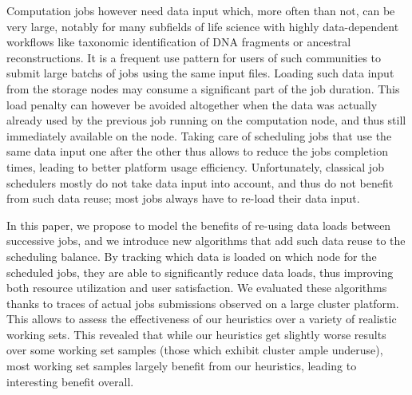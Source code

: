 \documentclass[conference]{IEEEtran}
\begin{document}
Computation jobs however need data input which, more often than not, can
be very large, notably for many subfields of life science with highly
data-dependent workflows like taxonomic identification of DNA fragments or ancestral reconstructions. It is a frequent use pattern for users of such communities to submit
large batchs of jobs using the same input files.
Loading such data input from the storage
nodes may consume a significant part of the job duration. This load
penalty can however be avoided altogether when the data was actually
already used by the previous job running on the computation node, and
thus still immediately available on the node. Taking care of scheduling
jobs that use the same data input one after the other thus allows to
reduce the jobs completion times, leading to better platform usage
efficiency. Unfortunately, classical job schedulers mostly do not take
data input into account, and thus do not benefit from such data reuse;
most jobs always have to re-load their data input.

In this paper, we propose to model the benefits of re-using data loads
between successive jobs, and we introduce new algorithms that add such
data reuse to the scheduling balance. By tracking which data is loaded
on which node for the scheduled jobs, they are able to significantly
reduce data loads, thus improving both resource utilization and user
satisfaction. We evaluated these algorithms thanks to traces of actual
jobs submissions observed on a large cluster platform. This allows to
assess the effectiveness of our heuristics over a variety of realistic
working sets. This revealed that while our heuristics get slightly worse
results over some working set samples (those which exhibit cluster ample
underuse), most working set samples largely benefit from our heuristics,
leading to interesting benefit overall.
\end{document}
